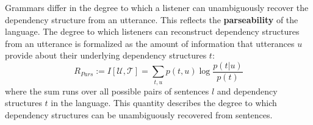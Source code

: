 \documentclass[9pt,twocolumn,twoside,lineno]{pnas-new}
\newcommand{\key}[1]{\textbf{#1}}
\begin{document}

Grammars differ in the degree to which a listener can unambiguously recover the dependency structure from an utterance.
This reflects the \key{parseability} of the language.
The degree to which listeners can reconstruct dependency structures from an utterance is formalized as the amount of information that utterances $u$ provide about their underlying dependency structures $t$:
\begin{equation}
	R_{Pars} := I[\mathcal{U},\mathcal{T}] = \sum_{t,u} p(t,u) \log \frac{p(t|u)}{p(t)}
\end{equation}
where the sum runs over all possible pairs of sentences $l$ and dependency structures $t$ in the language.
This quantity describes the degree to which dependency structures can be unambiguously recovered from sentences.


\end{document}
